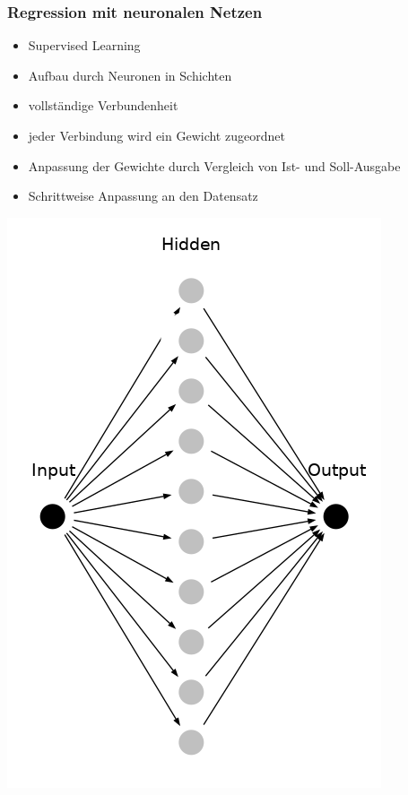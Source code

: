 
\begin{frame}
\frametitle{Regression mit neuronalen Netzen}

\begin{minipage}[t]{0.6\textwidth}\vspace{0pt}
	\begin{itemize}
		\item Supervised Learning
		\item Aufbau durch Neuronen in Schichten
		\item vollständige Verbundenheit
		\item jeder Verbindung wird ein Gewicht zugeordnet
		\item Anpassung der Gewichte durch Vergleich von Ist- und Soll-Ausgabe
		\item Schrittweise Anpassung an den Datensatz
	\end{itemize}
\end{minipage}%
\begin{minipage}[t]{0.4\textwidth}\vspace{0pt}
	\hspace{0.1\linewidth}\includegraphics[width=0.9\linewidth]{fig8/nnsample.png}
\end{minipage}%

\end{frame}

